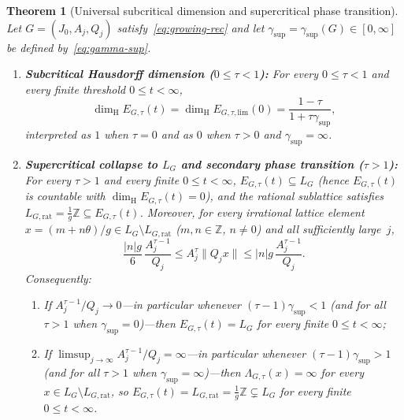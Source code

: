 \documentclass[11pt]{article}
\newtheorem{theorem}{Theorem}
\theoremstyle{definition}
\theoremstyle{remark}
\newcommand{\Z}{\mathbb{Z}}
\newcommand{\dimH}{\dim_{\mathrm{H}}}
\newcommand{\Lam}{\Lambda}
\begin{document}
\begin{theorem}[Universal subcritical dimension and supercritical phase transition]\label{thm:growing-rec-dim-phase}
Let $G=(J_0,A_j,Q_j)$ satisfy~\eqref{eq:growing-rec} and let
$\gamma_{\sup}=\gamma_{\sup}(G)\in[0,\infty]$ be defined by~\eqref{eq:gamma-sup}.
\begin{enumerate}[label=(\roman*),leftmargin=2.2em]
\item \textbf{Subcritical Hausdorff dimension ($0\le\tau<1$):}
For every $0\le\tau<1$ and every finite threshold $0\le t<\infty$,
\begin{equation}\label{eq:growing-subcritical-dim}
\dimH E_{G,\tau}(t)
=\dimH E_{G,\tau,\mathrm{lim}}(0)
=\frac{1-\tau}{1+\tau\gamma_{\sup}},
\end{equation}
interpreted as $1$ when $\tau=0$ and as $0$ when $\tau>0$ and $\gamma_{\sup}=\infty$.
\item \textbf{Supercritical collapse to $L_G$ and secondary phase transition ($\tau>1$):}
For every $\tau>1$ and every finite $0\le t<\infty$, $E_{G,\tau}(t)\subseteq L_G$
(hence $E_{G,\tau}(t)$ is countable with $\dimH E_{G,\tau}(t)=0$), and the
rational sublattice satisfies $L_{G,\mathrm{rat}}=\frac{1}{g}\Z\subseteq E_{G,\tau}(t)$.
Moreover, for every irrational lattice element $x=(m+n\theta)/g\in L_G\setminus L_{G,\mathrm{rat}}$
($m,n\in\Z$, $n\ne0$) and all sufficiently large~$j$,
\begin{equation}\label{eq:growing-supercritical-sandwich}
\frac{|n|g}{6}\,\frac{A_j^{\tau-1}}{Q_j}
\le A_j^\tau\|Q_j x\|
\le |n|g\,\frac{A_j^{\tau-1}}{Q_j}.
\end{equation}
Consequently:
\begin{enumerate}[label=(\alph*),leftmargin=1.6em]
\item If $A_j^{\tau-1}/Q_j\to0$---in particular whenever
$(\tau-1)\gamma_{\sup}<1$ (and for \emph{all} $\tau>1$ when $\gamma_{\sup}=0$)---then
$E_{G,\tau}(t)=L_G$ for every finite $0\le t<\infty$;
\item If $\limsup_{j\to\infty}A_j^{\tau-1}/Q_j=\infty$---in particular whenever
$(\tau-1)\gamma_{\sup}>1$ (and for \emph{all} $\tau>1$ when $\gamma_{\sup}=\infty$)---then
$\Lam_{G,\tau}(x)=\infty$ for every $x\in L_G\setminus L_{G,\mathrm{rat}}$, so
$E_{G,\tau}(t)=L_{G,\mathrm{rat}}=\frac{1}{g}\Z\subsetneq L_G$ for every finite
$0\le t<\infty$.
\end{enumerate}
\end{enumerate}
\end{theorem}
\end{document}
